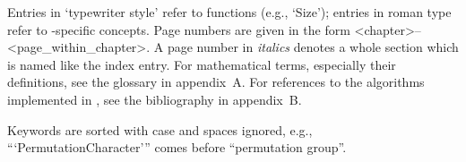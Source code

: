 
%
%
%
%
\BeginningOfBook
%
%
\TableOfContents
%
%
\FrontMatter
%
%
\Chapters
{}
%
%
\Appendices
%
%

\parindent 0pt

Entries  in   `typewriter  style' refer   to  {\GAP} functions  (e.g.,
`Size'); entries in roman type refer to {\GAP}-specific concepts. Page
numbers are given in the form <chapter>--<page_within_chapter>. A page
number in  {\it italics} denotes a  whole section  which is named like
the index entry. For mathematical terms, especially their definitions,
see  the   glossary in appendix~A.  For   references to the algorithms
implemented in {\GAP}, see the bibliography in appendix~B.

Keywords   are   sorted  with    case  and   spaces    ignored,  e.g.,
```PermutationCharacter''' comes before ``permutation group''.

\Index

\bye

